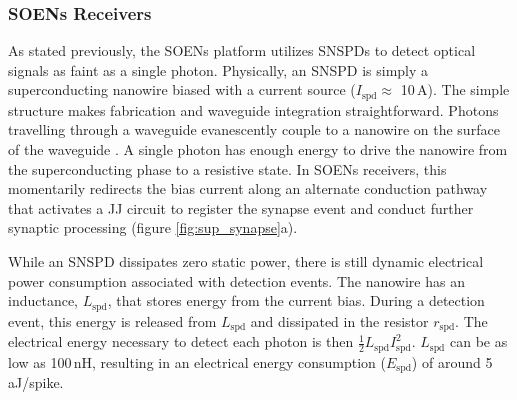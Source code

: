 \documentclass[twocolumn]{article}
\begin{document}
\subsubsection{SOENs Receivers}
As stated previously, the SOENs platform utilizes SNSPDs to detect optical signals as faint as a single photon. Physically, an SNSPD is simply a superconducting nanowire biased with a current source ($I_{\mathrm{spd}} \approx$ 10\,\textmu A). The simple structure makes fabrication and waveguide integration straightforward. Photons travelling through a waveguide evanescently couple to a nanowire on the surface of the waveguide \cite{ferrari2018waveguide, akhlaghi2015waveguide}. A single photon has enough energy to drive the nanowire from the superconducting phase to a resistive state. In SOENs receivers, this momentarily redirects the bias current along an alternate conduction pathway that activates a JJ circuit to register the synapse event and conduct further synaptic processing (figure \ref{fig:sup_synapse}a).

While an SNSPD dissipates zero static power, there is still dynamic electrical power consumption associated with detection events. The nanowire has an inductance, $L_{\mathrm{spd}}$, that stores energy from the current bias. During a detection event, this energy is released from $L_{\mathrm{spd}}$ and dissipated in the resistor $r_{\mathrm{spd}}$. The electrical energy necessary to detect each photon is then $\frac{1}{2}L_{\mathrm{spd}}I_{\mathrm{spd}}^2$. $L_{\mathrm{spd}}$ can be as low as 100\,nH, resulting in an electrical energy consumption ($E_{\mathrm{spd}}$) of around 5\,aJ/spike.
\end{document}
